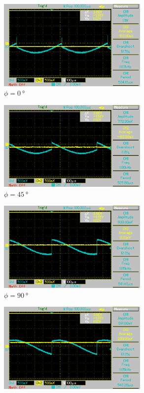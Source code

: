 \begin{figure}%
    \begin{subfigure}{0.5\textwidth}%
    \centering%
    \includegraphics[width = 7.3cm]{./Oszilloskop Bilder/png/5.3/nt1.png}%
    \caption{$\phi = \qty[]{0}{\degree}$}%
    \end{subfigure}%
    \hfill%
    \begin{subfigure}{0.5\textwidth}%
    \centering%
    \includegraphics[width = 7.3cm]{./Oszilloskop Bilder/png/5.3/nt2.png}%
    \caption{$\phi = \qty[]{45}{\degree}$}%
    \end{subfigure}%
    \hfill
    \begin{subfigure}{0.5\textwidth}%
    \centering%
    \includegraphics[width = 7.3cm]{./Oszilloskop Bilder/png/5.3/nt3.png}%
    \caption{$\phi = \qty[]{90}{\degree}$}%
    \end{subfigure}%
    \hfill%
    \begin{subfigure}{0.5\textwidth}%
    \centering%
    \includegraphics[width = 7.3cm]{./Oszilloskop Bilder/png/5.3/nt4.png}%

\end{subfigure}
\end{figure}
